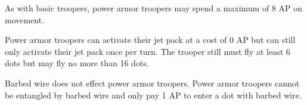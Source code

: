 As with basic troopers, power armor troopers may spend a maximum of 8 AP on movement.

Power armor troopers can activate their jet pack at a cost of 0 AP but can still only activate their jet pack once per turn.
The trooper still must fly at least 6 dots but may fly no more than 16 dots.

Barbed wire does not effect power armor troopers.
Power armor troopers cannot be entangled by barbed wire and only pay 1 AP to enter a dot with barbed wire.
